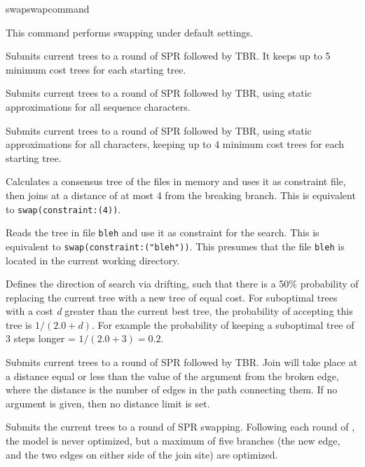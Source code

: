 \begin{command}{swap}{swapcommand}

\begin{poyexamples} 
{This command performs swapping under default settings.}

{Submits current trees to a round of SPR followed by TBR. It keeps
up to 5 minimum cost trees for each starting tree.}

{Submits current trees to a round of SPR followed by TBR, using
static approximations for all sequence characters.}

{Submits current trees to a round of SPR followed by TBR, using
static approximations for all characters, keeping up to 4 minimum
cost trees for each starting tree.}

{Calculates a consensus tree of the files in memory and uses it as
constraint file, then joins at a distance of at most 4 from the breaking
branch. This is equivalent to \texttt{swap(constraint:(4))}.}

{Reads the tree in file \texttt{bleh} and use it as constraint for the
search. This is equivalent to \texttt{swap(constraint:("bleh"))}. This 
presumes that the file \texttt{bleh} is located in the current working directory.}	

{Defines the direction of search via drifting, such that there is a 50\% probability of 
replacing the current tree with a new tree of equal cost. For suboptimal trees with 
a cost \emph{d} greater than the current best tree, the probability of accepting this tree 
is $1 / (2.0 + d)$. For example the
probability of keeping a suboptimal tree of 3 steps longer = $1 / (2.0 + 3) = 0.2$.}

{Submits current trees to a round of SPR followed by TBR. Join will take place
at a distance equal or less than the value of the argument from the broken edge, 
where the distance is the number of edges in the path connecting them. If no 
argument is given, then no distance limit is set.}

{Submits the current trees to a round of SPR swapping. Following each round of 
, the model is never optimized, but a maximum of five branches 
(the new edge, and the two edges on either side of the join site) are optimized.}


\end{poyexamples}
\end{command}
